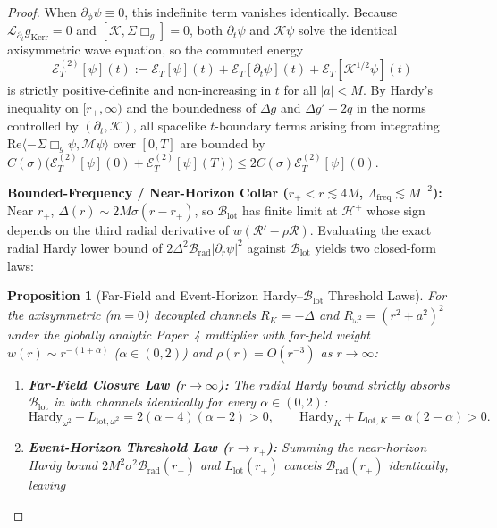 \documentclass[11pt, a4paper]{article}
\newtheorem{proposition}{Proposition}
\theoremstyle{remark}
\begin{document}
\begin{proof}
When $\partial_\phi\psi \equiv 0$, this indefinite term vanishes identically. Because $\mathcal{L}_{\partial_t} g_{\mathrm{Kerr}} = 0$ and $[\mathcal{K}, \Sigma\Box_g] = 0$, both $\partial_t\psi$ and $\mathcal{K}\psi$ solve the identical axisymmetric wave equation, so the commuted energy
\begin{equation}
\mathcal{E}^{(2)}_T[\psi](t) := \mathcal{E}_T[\psi](t) + \mathcal{E}_T[\partial_t\psi](t) + \mathcal{E}_T[\mathcal{K}^{1/2}\psi](t)
\end{equation}
is strictly positive-definite and non-increasing in $t$ for all $|a| < M$. By Hardy's inequality on $[r_+, \infty)$ and the boundedness of $\Delta g$ and $\Delta g' + 2q$ in the norms controlled by $(\partial_t, \mathcal{K})$, all spacelike $t$-boundary terms arising from integrating $\mathrm{Re}\langle -\Sigma\Box_g\psi, \mathcal{M}\psi\rangle$ over $[0, T]$ are bounded by $C(\sigma)\big(\mathcal{E}^{(2)}_T[\psi](0) + \mathcal{E}^{(2)}_T[\psi](T)\big) \le 2C(\sigma)\mathcal{E}^{(2)}_T[\psi](0)$.
\item \textbf{Bounded-Frequency / Near-Horizon Collar ($r_+ < r \lesssim 4M$, $\Lambda_{\mathrm{freq}} \lesssim M^{-2}$):} Near $r_+$, $\Delta(r) \sim 2M\sigma(r - r_+)$, so $\mathcal{B}_{\mathrm{lot}}$ has finite limit at $\mathcal{H}^+$ whose sign depends on the third radial derivative of $w(\mathcal{R}' - \rho\mathcal{R})$. Evaluating the exact radial Hardy lower bound of $2\Delta^2\mathcal{B}_{\mathrm{rad}}|\partial_r\psi|^2$ against $\mathcal{B}_{\mathrm{lot}}$ yields two closed-form laws:
\begin{proposition}[Far-Field and Event-Horizon Hardy--$\mathcal{B}_{\mathrm{lot}}$ Threshold Laws]
\label{prop:hardy-laws}
For the axisymmetric ($m = 0$) decoupled channels $R_K = -\Delta$ and $R_{\omega^2} = (r^2 + a^2)^2$ under the globally analytic Paper~4 multiplier with far-field weight $w(r) \sim r^{-(1+\alpha)}$ ($\alpha \in (0, 2)$) and $\rho(r) = O(r^{-3})$ as $r \to \infty$:
\begin{enumerate}
\item \textbf{Far-Field Closure Law ($r \to \infty$):} The radial Hardy bound strictly absorbs $\mathcal{B}_{\mathrm{lot}}$ in both channels identically for every $\alpha \in (0, 2)$:
\begin{equation}
\mathrm{Hardy}_{\omega^2} + L_{\mathrm{lot},\omega^2} = 2(\alpha - 4)(\alpha - 2) > 0, \qquad \mathrm{Hardy}_K + L_{\mathrm{lot},K} = \alpha(2 - \alpha) > 0.
\end{equation}
\item \textbf{Event-Horizon Threshold Law ($r \to r_+$):} Summing the near-horizon Hardy bound $2M^2\sigma^2\mathcal{B}_{\mathrm{rad}}(r_+)$ and $L_{\mathrm{lot}}(r_+)$ cancels $\mathcal{B}_{\mathrm{rad}}(r_+)$ identically, leaving

\end{enumerate}
\end{proposition}
\end{proof}
\end{document}
